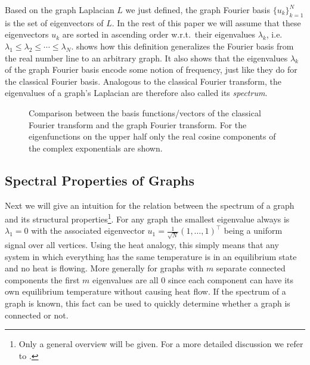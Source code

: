 Based on the graph Laplacian $L$ we just defined, the graph Fourier basis ${\{ u_k \}}_{k = 1}^{N}$ is the set of eigenvectors of $L$.
In the rest of this paper we will assume that these eigenvectors $u_k$ are sorted in ascending order w.r.t.\  their eigenvalues $\lambda_k$, i.e.\  $\lambda_1 \leq \lambda_2 \leq \cdots \leq \lambda_N$.
 shows how this definition generalizes the Fourier basis from the real number line to an arbitrary graph.
It also shows that the eigenvalues $\lambda_k$ of the graph Fourier basis encode some notion of frequency, just like they do for the classical Fourier basis.
Analogous to the classical Fourier transform, the eigenvalues of a graph's Laplacian are therefore also called its \textit{spectrum}.
\begin{figure}[ht]
	\centering
	\caption{%
		Comparison between the basis functions/vectors of the classical Fourier transform and the graph Fourier transform.
		For the eigenfunctions on the upper half only the real cosine components of the complex exponentials are shown.
	}\label{fig:sgt:graphFourier}
\end{figure}

\subsection{Spectral Properties of Graphs}%
\label{sec:sgt:spectrum}

Next we will give an intuition for the relation between the spectrum of a graph and its structural properties\footnote{%
	Only a general overview will be given. For a more detailed discussion we refer to \citet{Shuman2013}.
}.
For any graph the smallest eigenvalue always is $\lambda_1 = 0$ with the associated eigenvector $u_1 = \frac{1}{\sqrt{N}} {(1, \dots, 1)}^\top$ being a uniform signal over all vertices.
Using the heat analogy, this simply means that any system in which everything has the same temperature is in an equilibrium state and no heat is flowing.
More generally for graphs with $m$ separate connected components the first $m$ eigenvalues are all $0$ since each component can have its own equilibrium temperature without causing heat flow.
If the spectrum of a graph is known, this fact can be used to quickly determine whether a graph is connected or not.

